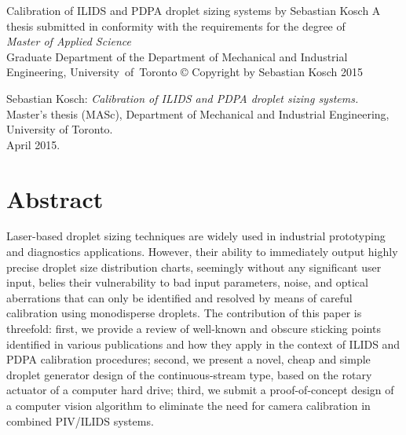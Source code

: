 \documentclass[11.5pt,oneside]{book}
\begin{document}
\frontmatter
%
\thispagestyle{empty}
\begin{center}
  \vskip 1in
  Calibration of ILIDS and PDPA droplet sizing systems
  \vskip 1.2in
  by
  \vskip 1.2in 
  Sebastian Kosch
  \vskip 2in
  A thesis submitted in conformity with the requirements for the degree of\\
  \emph{Master of Applied Science}\\[2ex]
  Graduate Department of the Department of Mechanical and Industrial
  Engineering, University~of~Toronto
  \vskip 1.3in
  © Copyright by Sebastian Kosch 2015
\end{center}

\pagebreak
\noindent Sebastian Kosch: \emph{Calibration of ILIDS and PDPA droplet sizing systems.}\\
Master's thesis (MASc), Department of Mechanical and Industrial Engineering,\\
University of Toronto.\\
April 2015.

\section*{Abstract}
\thispagestyle{plain}
\begin{doublespace}
Laser-based droplet sizing techniques are widely used in industrial prototyping and
diagnostics applications. However, their ability to immediately output highly
precise droplet size distribution charts, seemingly without any significant user
input, belies their vulnerability to bad input parameters, noise, and optical
aberrations that can only be identified and resolved by means of careful
calibration using monodisperse droplets. The contribution of this paper is
threefold: first, we provide a review of well-known and obscure sticking points
identified in various publications and how they apply in the context of ILIDS
and PDPA calibration procedures; second, we present a novel, cheap and simple
droplet generator design of the continuous-stream type, based on the rotary
actuator of a computer hard drive; third, we submit a proof-of-concept design of
a computer vision algorithm to eliminate the need for camera calibration in
combined PIV/ILIDS systems.
\end{doublespace}
\vfill
\pagebreak
\end{document}
